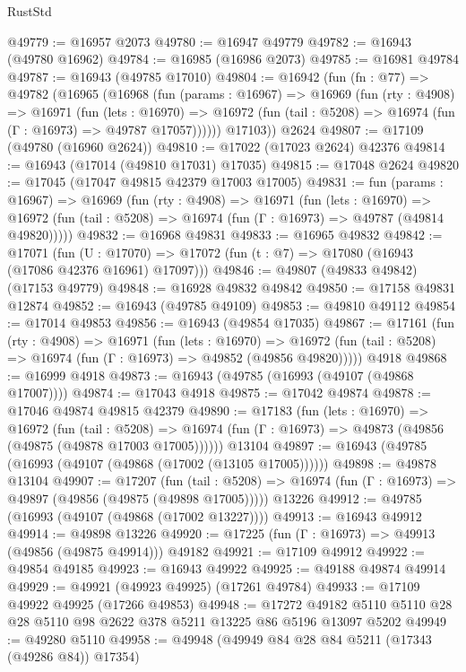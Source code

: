 \begin{lexlean}{RustStd}
\begin{coremodule}
@49779 := @16957 @2073
@49780 := @16947 @49779
@49782 := @16943 (@49780 @16962)
@49784 := @16985 (@16986 @2073)
@49785 := @16981 @49784
@49787 := @16943 (@49785 @17010)
@49804 := @16942
    (fun (fn : @77) =>
    @49782
      (@16965
        (@16968
          (fun (params : @16967) =>
          @16969
            (fun (rty : @4908) =>
            @16971
              (fun (lets : @16970) =>
              @16972 (fun (tail : @5208) => @16974 (fun (Γ : @16973) => @49787 @17057))))))
        @17103))
    @2624
@49807 := @17109 (@49780 (@16960 @2624))
@49810 := @17022 (@17023 @2624) @42376
@49814 := @16943 (@17014 (@49810 @17031) @17035)
@49815 := @17048 @2624
@49820 := @17045 (@17047 @49815 @42379 @17003 @17005)
@49831 := fun (params : @16967) =>
  @16969
    (fun (rty : @4908) =>
    @16971
      (fun (lets : @16970) =>
      @16972 (fun (tail : @5208) => @16974 (fun (Γ : @16973) => @49787 (@49814 @49820)))))
@49832 := @16968 @49831
@49833 := @16965 @49832
@49842 := @17071
    (fun (U : @17070) => @17072 (fun (t : @7) => @17080 (@16943 (@17086 @42376 @16961) @17097)))
@49846 := @49807 (@49833 @49842) (@17153 @49779)
@49848 := @16928 @49832 @49842
@49850 := @17158 @49831 @12874
@49852 := @16943 (@49785 @49109)
@49853 := @49810 @49112
@49854 := @17014 @49853
@49856 := @16943 (@49854 @17035)
@49867 := @17161
    (fun (rty : @4908) =>
    @16971
      (fun (lets : @16970) =>
      @16972 (fun (tail : @5208) => @16974 (fun (Γ : @16973) => @49852 (@49856 @49820)))))
    @4918
@49868 := @16999 @4918
@49873 := @16943 (@49785 (@16993 (@49107 (@49868 @17007))))
@49874 := @17043 @4918
@49875 := @17042 @49874
@49878 := @17046 @49874 @49815 @42379
@49890 := @17183
    (fun (lets : @16970) =>
    @16972
      (fun (tail : @5208) =>
      @16974 (fun (Γ : @16973) => @49873 (@49856 (@49875 (@49878 @17003 @17005))))))
    @13104
@49897 := @16943 (@49785 (@16993 (@49107 (@49868 (@17002 (@13105 @17005))))))
@49898 := @49878 @13104
@49907 := @17207
    (fun (tail : @5208) => @16974 (fun (Γ : @16973) => @49897 (@49856 (@49875 (@49898 @17005)))))
    @13226
@49912 := @49785 (@16993 (@49107 (@49868 (@17002 @13227))))
@49913 := @16943 @49912
@49914 := @49898 @13226
@49920 := @17225 (fun (Γ : @16973) => @49913 (@49856 (@49875 @49914))) @49182
@49921 := @17109 @49912
@49922 := @49854 @49185
@49923 := @16943 @49922
@49925 := @49188 @49874 @49914
@49929 := @49921 (@49923 @49925) (@17261 @49784)
@49933 := @17109 @49922 @49925 (@17266 @49853)
@49948 := @17272 @49182 @5110 @5110 @28 @28 @5110 @98 @2622 @378 @5211 @13225 @86 @5196 @13097 @5202
@49949 := @49280 @5110
@49958 := @49948 (@49949 @84 @28 @84 @5211 (@17343 (@49286 @84)) @17354)

\end{coremodule}
\end{lexlean}
